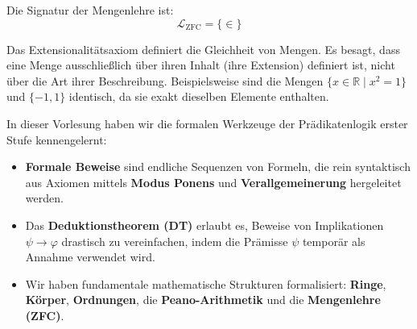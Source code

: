 \begin{math-stroke}
Die Signatur der Mengenlehre ist:
\[ \mathcal{L}_{\text{ZFC}} = \{\in\} \]


\begin{explanation-of-steps}
Das Extensionalitätsaxiom definiert die Gleichheit von Mengen. Es besagt, dass eine Menge ausschließlich über ihren Inhalt (ihre Extension) definiert ist, nicht über die Art ihrer Beschreibung. Beispielsweise sind die Mengen $\{x \in \mathbb{R} \mid x^2 = 1\}$ und $\{-1, 1\}$ identisch, da sie exakt dieselben Elemente enthalten.
\end{explanation-of-steps}
\end{math-stroke}

\begin{nice-box}
In dieser Vorlesung haben wir die formalen Werkzeuge der Prädikatenlogik erster Stufe kennengelernt:
\begin{itemize}
    \item \textbf{Formale Beweise} sind endliche Sequenzen von Formeln, die rein syntaktisch aus Axiomen mittels \textbf{Modus Ponens} und \textbf{Verallgemeinerung} hergeleitet werden.
    \item Das \textbf{Deduktionstheorem (DT)} erlaubt es, Beweise von Implikationen $\psi \rightarrow \varphi$ drastisch zu vereinfachen, indem die Prämisse $\psi$ temporär als Annahme verwendet wird.
    \item Wir haben fundamentale mathematische Strukturen formalisiert: \textbf{Ringe}, \textbf{Körper}, \textbf{Ordnungen}, die \textbf{Peano-Arithmetik} und die \textbf{Mengenlehre (ZFC)}.
\end{itemize}
\end{nice-box}
